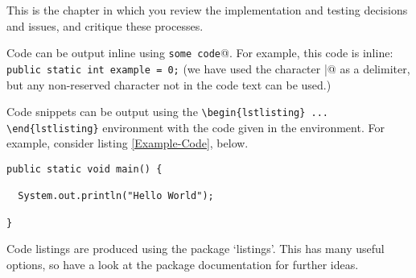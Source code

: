 \documentclass[../report.tex]{subfiles}
\begin{document}

This is the chapter in which you review the implementation and testing decisions and issues, and critique these processes.

Code can be output inline using \verb@\lstinline|some code|@.  For example, this code is inline: \lstinline|public static int example = 0;| (we have used the character \verb@|@ as a delimiter, but any non-reserved character not in the code text can be used.)

Code snippets can be output using the \verb|\begin{lstlisting} ... \end{lstlisting}|
environment with the code given in the environment. For example, consider listing \ref{Example-Code}, below.

\begin{lstlisting}[breaklines,breakatwhitespace,caption={Example code},label=Example-Code]
public static void main() {

  System.out.println("Hello World");

}
\end{lstlisting}

Code listings are produced using the package `listings'.  This has many useful options, so have a look at the package documentation for further ideas.
\end{document}
